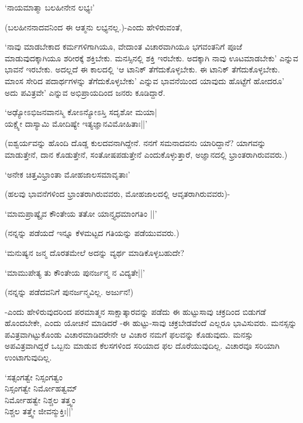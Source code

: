 \begin{shloka}
`ನಾಯಮಾತ್ಮಾ ಬಲಹೀನೇನ ಲಭ್ಯಃ'
\end{shloka}

(ಬಲಹೀನನಾದವನಿಂದ ಈ ಆತ್ಮನು ಲಭ್ಯನಲ್ಲ.)-ಎಂದು ಹೇಳಿರುವಂತೆ,

`ನಾವು ಮಾಡಬೇಕಾದ ಕರ್ಮಗಳಿಗಾಗಿಯೂ, ವೇದಾಂತ ವಿಚಾರವಾಗಿಯೂ ಭಗವಂತನಿಗೆ ಪೂಜೆ ಮಾಡುವುದಕ್ಕಾಗಿಯೂ ಶರೀರಕ್ಕೆ ಶಕ್ತಿಬೇಕು. ಮನಸ್ಸಿನಲ್ಲಿ ಶಕ್ತಿ ಇರಬೇಕು. ಅದಕ್ಕಾಗಿ ನಾವು ಊಟಮಾಡಬೇಕು' ಎನ್ನುವ ಭಾವನೆ ಇರಬೇಕು. ಅದಲ್ಲದೆ ಈ ಕಾಲದಲ್ಲಿ `ಆ ಟಾನಿಕ್ ತೆಗೆದುಕೊಳ್ಳಬೇಕು. ಈ ಟಾನಿಕ್ ತೆಗೆದುಕೊಳ್ಳಬೇಕು. ಮಾಂಸ ಸೇರಿದ ಪದಾರ್ಥಗಳನ್ನು ತೆಗೆದುಕೊಳ್ಳಬೇಕು' ಎನ್ನುವ ಭಾವನೆಯಿಂದ ಯಾವುದು ಹೊಟ್ಟೆಗೆ ಹೋದರೂ' ಅದು ಪವಿತ್ರವೇ' ಎನ್ನುವ ಅಭಿಪ್ರಾಯದಿಂದ ಜನರು ಕೂಡಿದ್ದಾರೆ.

\begin{shloka}
`ಅಢ್ಯೋಽಭಿಜನವಾನಸ್ಮಿ ಕೋಽನ್ಯೋಽಸ್ತಿ ಸದೃಶೋ ಮಯಾ|\\
ಯಕ್ಷ್ಯೇ ದಾಸ್ಯಾಮಿ ಮೋದಿಷ್ಯೇ ಇತ್ಯಜ್ಞಾನವಿಮೋಹಿತಾಃ||'
\end{shloka}

(ಐಶ್ವರ್ಯವನ್ನು ಹೊಂದಿ ದೊಡ್ಡ ಕುಲದವನಾಗಿದ್ದೇನೆ. ನನಗೆ ಸಮನಾದವನು ಯಾರಿದ್ದಾನೆ? ಯಾಗವನ್ನು ಮಾಡುತ್ತೇನೆ, ದಾನ ಕೊಡುತ್ತೇನೆ, ಸಂತೋಷಪಡುತ್ತೇನೆ ಎಂದುಕೊಳ್ಳುತ್ತಾರೆ, ಅಜ್ಞಾನದಲ್ಲಿ ಭ್ರಾಂತರಾಗಿರುವವರು.)

\begin{shloka}
`ಅನೇಕ ಚಿತ್ತವಿಭ್ರಾಂತಾ ಮೋಹಜಾಲಸಮಾವೃತಾಃ'
\end{shloka}

(ಹಲವು ಭಾವನೆಗಳಿಂದ ಭ್ರಾಂತರಾಗಿರುವವರು, ಮೋಹಜಾಲದಲ್ಲಿ ಆವೃತ\-ರಾಗಿರುವವರು)-

\begin{shloka}
`ಮಾಮಪ್ರಾಷ್ಯೈವ ಕೌಂತೇಯ ತತೋ ಯಾನ್ತ್ಯಧಮಾಂಗತಿಂ ||'
\end{shloka}

(ನನ್ನನ್ನು ಪಡೆಯದೆ ಇನ್ನೂ ಕೆಳಮಟ್ಟದ ಗತಿಯನ್ನು ಪಡೆಯುವವರು.)

`ಮನುಷ್ಯನ ಜನ್ಮ ದೊರತಮೇಲೆ ಅದನ್ನು ವ್ಯರ್ಥ ಮಾಡಿಕೊಳ್ಳಬಹುದೇ?

\begin{shloka}
`ಮಾಮುಪೇತ್ಯ ತು ಕೌಂತೇಯ ಪುನರ್ಜನ್ಮ ನ ವಿದ್ಯತೇ||'
\end{shloka}

(ನನ್ನನ್ನು ಪಡೆದವನಿಗೆ ಪುನರ್ಜನ್ಮವಿಲ್ಲ. ಅರ್ಜುನ!)

-ಎಂದು ಹೇಳಿರುವುದರಿಂದ ಪರಮಾತ್ಮನ ಸಾಕ್ಷಾತ್ಕಾರವನ್ನು ಪಡೆದು ಈ ಹುಟ್ಟುಸಾವು ಚಕ್ರದಿಂದ ಬಿಡುಗಡೆ ಹೊಂದಬೇಕೇ, ಎಂದು ಯೋಚನೆ ಮಾಡಿದರೆ -ಈ ಹುಟ್ಟು-ಸಾವು ಚಕ್ರಬೇಡವೆಂದೆ ಎಲ್ಲರೂ ಭಾವಿಸುವರು. ಮನಸ್ಸನ್ನು ಪವಿತ್ರವಾಗಿಟ್ಟುಕೊಂಡು ವಿಚಾರಮಾಡಿದರೇನೇ ಆ ವಿಚಾರ ನಮಗೆ ಫಲವನ್ನು ಕೊಡುವುದು. ಮನಸ್ಸು ಅಪವಿತ್ರವಾಗಿದ್ದರೆ ಒಬ್ಬನು ಮಾಡುವ ಕೆಲಸಗಳಿಂದ ಸರಿಯಾದ ಫಲ ದೊರೆಯುವುದಿಲ್ಲ. ವಿಚಾರವೂ ಸರಿಯಾಗಿ ಉಂಟಾಗುವುದಿಲ್ಲ.

\begin{shloka}
`ಸತ್ಸಂಗತ್ವೇ ನಿಸ್ಸಂಗತ್ವಂ\\
ನಿಸ್ಸಂಗತ್ವೇ ನಿರ್ಮೋಹತ್ವಮ್\\
ನಿರ್ಮೋಹತ್ವೇ ನಿಶ್ಚಲ ತತ್ತ್ವಂ\\
ನಿಶ್ಚಲ ತತ್ತ್ವೇ ಜೀವನ್ಮುಕ್ತಿಃ||'
\end{shloka}

